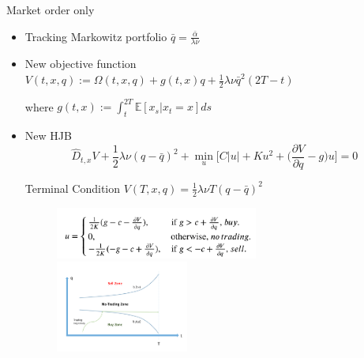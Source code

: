 \begin{frame}{Market order only}
\begin{itemize}

\item Tracking Markowitz portfolio
$
\bar q=\frac{\bar \alpha}{\lambda \nu}
$

\item New objective function   $V(t,x,q):=\Omega(t,x,q)+g(t,x)q+\frac12 \lambda \nu \bar q^2(2T-t) $

where $g(t,x):=\int_t^{2T}\mathbb E[x_s|x_t=x]ds$

\item New HJB
$$
\hat D_{t,x}V+\frac12 \lambda \nu (q-\bar q)^2+\min_u\big[C|u|+Ku^2+\big(\frac{\partial V}{\partial q}-g\big)u \big]=0
$$

Terminal Condition
$
V(T,x,q)=\frac12 \lambda \nu T(q-\bar q)^2
$



\begin{figure}
\centering
\begin{minipage}[c]{0.5\textwidth}
\centering
\includegraphics[height=1.7cm]{img/equ.png}
\end{minipage}%
\begin{minipage}[c]{0.5\textwidth}
\centering
\includegraphics[height=3cm]{img/threezone.png}
\end{minipage}
\end{figure}


\end{itemize}
\end{frame}


